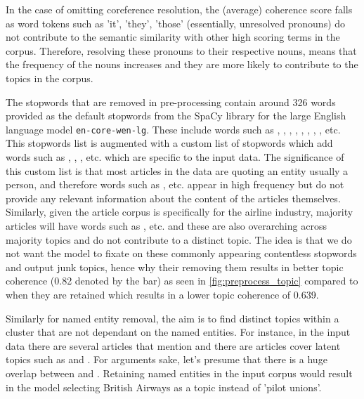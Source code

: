 In the case of omitting coreference resolution, the (average) coherence score falls as word tokens such as 'it', 'they', 'those' (essentially, unresolved pronouns) do not contribute to the semantic similarity with other high scoring terms in the corpus. Therefore, resolving these pronouns to their respective nouns, means that the frequency of the nouns increases and they are more likely to contribute to the topics in the corpus. 

The stopwords that are removed in pre-processing contain around 326 words provided as the default stopwords from the SpaCy library for the large English language model \texttt{en-core-wen-lg}. These include words such as , , , , , , , ,  etc. This stopwords list is augmented with a custom list of stopwords which add words such as , , ,  etc. which are specific to the input data. The significance of this custom list is that most articles in the data are quoting an entity usually a person, and therefore words such as  ,  etc. appear in high frequency but do not provide any relevant information about the content of the articles themselves. Similarly, given the article corpus is specifically for the airline industry, majority articles will have words such as ,  etc. and these are also overarching across majority topics and do not contribute to a distinct topic. The idea is that we do not want the model to fixate on these commonly appearing contentless stopwords and output junk topics, hence why their removing them results in better topic coherence (0.82 denoted by the  bar) as seen in \ref{fig:preprocess_topic} compared to when they are retained which results in a lower topic coherence of 0.639. 

Similarly for named entity removal, the aim is to find distinct topics within a cluster that are not dependant on the named entities. For instance, in the input data there are several articles that mention  and there are articles cover latent topics such as  and . For arguments sake, let's presume that there is a huge overlap between  and . Retaining named entities in the input corpus would result in  the model selecting British Airways as a topic instead of 'pilot unions'. 


